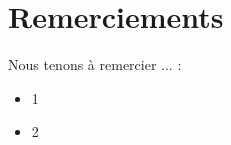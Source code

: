 \section*{Remerciements}

Nous tenons à remercier ... :

\begin{itemize}
	\item 1
	\item 2
\end{itemize}

\pagebreak
